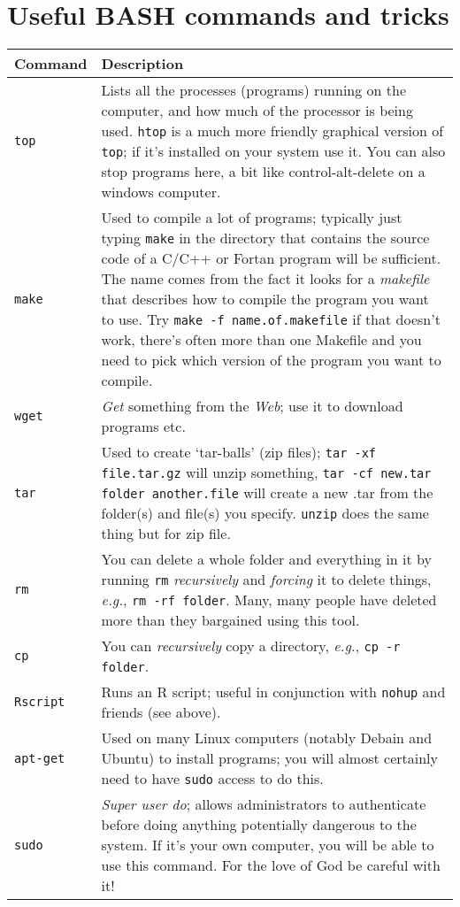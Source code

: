 \documentclass[12pt]{report}
\begin{document}
\section{Useful BASH commands and tricks}
\begin{tabular}{l p{14cm}}\hline
  \textbf{Command} & \textbf{Description}\\\hline
  \texttt{top} & Lists all the processes (programs) running on the computer, and how much of the processor is being used. \texttt{htop} is a much more friendly graphical version of \texttt{top}; if it's installed on your system use it. You can also stop programs here, a bit like control-alt-delete on a windows computer.\\
  \texttt{make} & Used to compile a lot of programs; typically just typing \texttt{make} in the directory that contains the source code of a C/C++ or Fortan program will be sufficient. The name comes from the fact it looks for a \emph{makefile} that describes how to compile the program you want to use. Try \texttt{make -f name.of.makefile} if that doesn't work, there's often more than one Makefile and you need to pick which version of the program you want to compile.\\
  \texttt{wget} & \emph{Get} something from the \emph{Web}; use it to download programs etc.\\
  \texttt{tar} & Used to create `tar-balls' (zip files); \texttt{tar -xf file.tar.gz} will unzip something, \texttt{tar -cf new.tar folder another.file} will create a new .tar from the folder(s) and file(s) you specify. \texttt{unzip} does the same thing but for zip file.\\
  \texttt{rm} & You can delete a whole folder and everything in it by running \texttt{rm} \emph{recursively} and \emph{forcing} it to delete things, \emph{e.g.}, \texttt{rm -rf folder}. Many, many people have deleted more than they bargained using this tool.\\
  \texttt{cp} & You can \emph{recursively} copy a directory, \emph{e.g.}, \texttt{cp -r folder}.\\
  \texttt{Rscript} & Runs an R script; useful in conjunction with \texttt{nohup} and friends (see above).\\
    \texttt{apt-get} & Used on many Linux computers (notably Debain and Ubuntu) to install programs; you will almost certainly need to have \texttt{sudo} access to do this.\\
  \texttt{sudo} & \emph{Super user do}; allows administrators to authenticate before doing anything potentially dangerous to the system. If it's your own computer, you will be able to use this command. For the love of God be careful with it!\\

\end{tabular}
\end{document}
